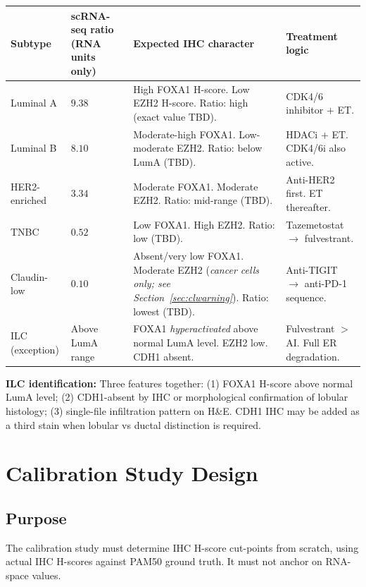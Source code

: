 \documentclass[11pt, a4paper]{article}
\begin{document}
\begin{center}
\begin{tabular}{p{2.5cm}p{2.2cm}p{4cm}
                p{4.8cm}}
\toprule
\textbf{Subtype} &
\textbf{scRNA-seq ratio (RNA units only)} &
\textbf{Expected IHC character} &
\textbf{Treatment logic} \\
\midrule
Luminal A & $9.38$ &
High FOXA1 H-score.
Low EZH2 H-score.
Ratio: high
(exact value TBD). &
CDK4/6 inhibitor $+$ ET. \\[0.4em]
Luminal B & $8.10$ &
Moderate-high FOXA1.
Low-moderate EZH2.
Ratio: below LumA
(TBD). &
HDACi $+$ ET.
CDK4/6i also active. \\[0.4em]
HER2-enriched & $3.34$ &
Moderate FOXA1.
Moderate EZH2.
Ratio: mid-range
(TBD). &
Anti-HER2 first.
ET thereafter. \\[0.4em]
TNBC & $0.52$ &
Low FOXA1.
High EZH2.
Ratio: low (TBD). &
Tazemetostat $\rightarrow$
fulvestrant. \\[0.4em]
Claudin-low & $0.10$ &
Absent/very low FOXA1.
Moderate EZH2
(\textit{cancer cells only;
see Section~\ref{sec:clwarning}}).
Ratio: lowest (TBD). &
Anti-TIGIT $\rightarrow$
anti-PD-1 sequence. \\[0.4em]
ILC
(exception) &
Above LumA range &
FOXA1 \textit{hyperactivated}
above normal LumA level.
EZH2 low.
CDH1 absent. &
Fulvestrant $>$ AI.
Full ER degradation. \\
\bottomrule
\end{tabular}
\end{center}

\textbf{ILC identification:} Three features
together: (1) FOXA1 H-score above normal LumA
level; (2) CDH1-absent by IHC or morphological
confirmation of lobular histology; (3) single-file
infiltration pattern on H\&E. CDH1 IHC may be
added as a third stain when lobular vs ductal
distinction is required.

\section{Calibration Study Design}
\label{sec:calibration}

\subsection{Purpose}

The calibration study must determine IHC
H-score cut-points from scratch, using
actual IHC H-scores against PAM50 ground
truth. It must not anchor on RNA-space
values.
\end{document}
